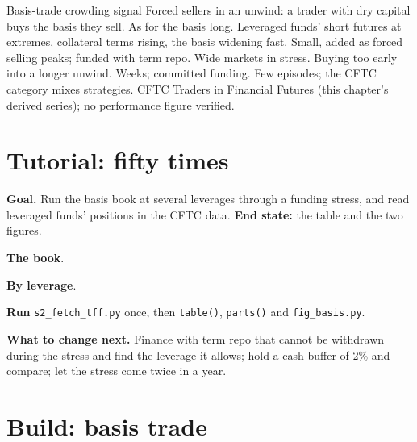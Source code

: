 \begin{strategyfile}{Basis-trade crowding signal}\label{strat:s2:the-bond-futures-basis-trade:crowding}
 Forced sellers in an unwind: a trader with dry capital buys the basis they sell.
 As for the basis long.
 Leveraged funds' short futures at extremes, collateral terms rising, the basis widening fast.
 Small, added as forced selling peaks; funded with term repo.
 Wide markets in stress.
 Buying too early into a longer unwind.
 Weeks; committed funding.
 Few episodes; the CFTC category mixes strategies.
 CFTC Traders in Financial Futures (this chapter's derived series); no performance figure verified.
\end{strategyfile}

\section{Tutorial: fifty times}\label{tut:s2:the-bond-futures-basis-trade:tut}

\begin{tutorial}
\textbf{Goal.} Run the basis book at several leverages through a funding stress, and read leveraged funds' positions in the CFTC data.
\textbf{End state:} the table and the two figures.
\begin{tutsteps}
\item \textbf{The book}.
\label{lst:s2:the-bond-futures-basis-trade:book}
\item \textbf{By leverage}.
\label{lst:s2:the-bond-futures-basis-trade:table}
\item \textbf{Run} \texttt{s2\_fetch\_tff.py} once, then \texttt{table()}, \texttt{parts()} and \texttt{fig\_basis.py}.
\end{tutsteps}
\textbf{What to change next.} Finance with term repo that cannot be withdrawn during the stress and find the leverage it allows; hold a cash buffer
of 2\% and compare; let the stress come twice in a year.
\end{tutorial}

\section{Build: basis trade}\label{bld:s2:the-bond-futures-basis-trade:basistrade}

